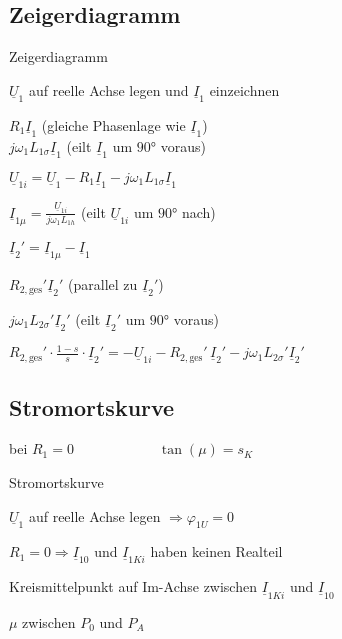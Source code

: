 \begin{sectionbox}
\subsection{Zeigerdiagramm}
\begin{cookbox}{Zeigerdiagramm}
\item $\underline{U}_1$ auf reelle Achse legen und $\underline{I}_1$ einzeichnen
\item $R_1\underline{I}_1$ (gleiche Phasenlage wie $\underline{I}_1$)\\
$j\omega_1 L_{1\sigma}\underline{I}_1$ (eilt $\underline{I}_1$ um $\ang{90}$ voraus)
\item $\underline{U}_{1i} = \underline{U}_1 - R_1\underline{I}_1 - j\omega_1 L_{1\sigma}\underline{I}_1$
\item $\underline{I}_{1\mu} = \frac{\underline{U}_{1i}}{j\omega_1 L_{1h}}$ (eilt $\underline{U}_{1i}$ um $\ang{90}$ nach)
\item $\underline{I}_2' = \underline{I}_{1\mu} - \underline{I}_1$
\item $R_{2,\text{ges}}'\underline{I}_2'$ (parallel zu $\underline{I}_2'$)
\item $j\omega_1 L_{2\sigma}'\underline{I}_2'$ (eilt $\underline{I}_2'$ um $\ang{90}$ voraus)
\item $R_{2,\text{ges}}'\cdot\frac{1-s}{s}\cdot\underline{I}_2' = -\underline{U}_{1i} - R_{2,\text{ges}}'\,\underline{I}_2' - j\omega_1 L_{2\sigma}'\underline{I}_2'$
\end{cookbox}
\begin{center}

\end{center}
\end{sectionbox}

\begin{sectionbox}
\subsection{Stromortskurve}
\begin{symbolbox}
  bei $R_1 = 0\qquad\qquad\qquad\tan(\mu) = s_K$
\end{symbolbox}
\begin{cookbox}{Stromortskurve}
\item $\underline{U}_1$ auf reelle Achse legen $\Rightarrow\varphi_{1U} = 0$
\item $R_1 = 0\Rightarrow \underline I_{10}$ und $\underline I_{1Ki}$ haben keinen Realteil
\item Kreismittelpunkt auf Im-Achse zwischen $\underline{I}_{1Ki}$ und $\underline{I}_{10}$
\item $\mu$ zwischen $P_0$ und $P_A$
\end{cookbox}

\end{sectionbox}

